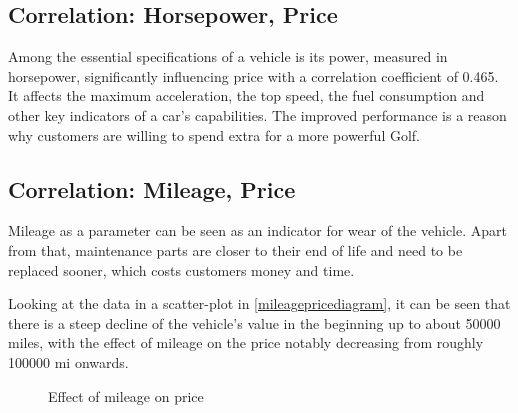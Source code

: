\subsection{Correlation: Horsepower, Price}
\label{subsectionhpprice}
Among the essential specifications of a vehicle is its power, measured in horsepower, significantly influencing price with a correlation coefficient of 0.465.
It affects the maximum acceleration, the top speed, the fuel consumption and other key indicators of a car's capabilities.
The improved performance is a reason why customers are willing to spend extra for a more powerful Golf.
\subsection{Correlation: Mileage, Price}
Mileage as a parameter can be seen as an indicator for wear of the vehicle.
Apart from that, maintenance parts are closer to their end of life and need to be replaced sooner,
which costs customers money and time.
\par
Looking at the data in a scatter-plot in \autoref{mileagepricediagram}, it can be seen that there is a steep decline of the vehicle's value in the beginning up to about 50000 miles,
with the effect of mileage on the price notably decreasing from roughly 100000 mi onwards.
\begin{figure}[H]
    \caption{Effect of mileage on price}
    \label{mileagepricediagram}
\end{figure}

